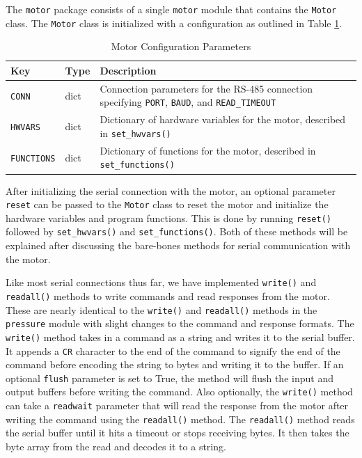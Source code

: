 The \texttt{motor} package consists of a single \texttt{motor} module that contains the \texttt{Motor} class.
The \texttt{Motor} class is initialized with a configuration as outlined in Table \ref{readout/table:motor_config}.

\begin{table}
    \centering
    \begin{tabularx}{\textwidth}{l|l|X}
        \textbf{Key} & \textbf{Type} & \textbf{Description} \\ \hline    
        \texttt{CONN} & dict & Connection parameters for the RS-485 connection specifying \texttt{PORT}, \texttt{BAUD}, and \texttt{READ\_TIMEOUT} \\
        \texttt{HWVARS} & dict & Dictionary of hardware variables for the motor, described in \texttt{set\_hwvars()}\\
        \texttt{FUNCTIONS} & dict & Dictionary of functions for the motor, described in \texttt{set\_functions()}\\
    \end{tabularx}
    \label{readout/table:motor_config}
    \caption{Motor Configuration Parameters}
\end{table}

After initializing the serial connection with the motor, an optional parameter \texttt{reset} can be passed to the \texttt{Motor} class to reset the motor and initialize the hardware variables and program functions.
This is done by running \texttt{reset()} followed by \texttt{set\_hwvars()} and \texttt{set\_functions()}.
Both of these methods will be explained after discussing the bare-bones methods for serial communication with the motor.

Like most serial connections thus far, we have implemented \texttt{write()} and \texttt{readall()} methods to write commands and read responses from the motor.
These are nearly identical to the \texttt{write()} and \texttt{readall()} methods in the \texttt{pressure} module with slight changes to the command and response formats.
The \texttt{write()} method takes in a command as a string and writes it to the serial buffer.
It appends a \texttt{CR} character to the end of the command to signify the end of the command before encoding the string to bytes and writing it to the buffer.
If an optional \texttt{flush} parameter is set to True, the method will flush the input and output buffers before writing the command.
Also optionally, the \texttt{write()} method can take a \texttt{readwait} parameter that will read the response from the motor after writing the command using the \texttt{readall()} method.
The \texttt{readall()} method reads the serial buffer until it hits a timeout or stops receiving bytes.
It then takes the byte array from the read and decodes it to a string.

